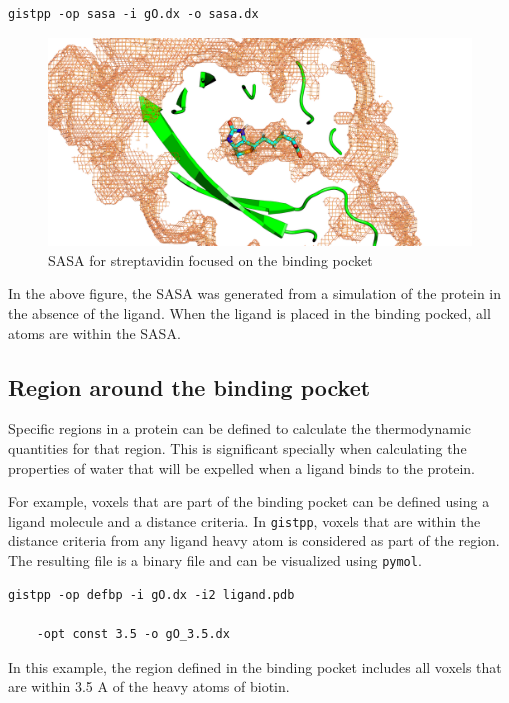 \documentclass[9pt,tutorial]{livecoms}
\newcommand{\software}{\texttt}
\begin{document}
\begin{lstlisting}[style=bash]
	gistpp -op sasa -i gO.dx -o sasa.dx
\end{lstlisting}

\begin{figure}
	\centering
	\includegraphics[width=1.0\linewidth]{streptavidin_sasa_close.png}
	\caption{SASA for streptavidin focused on the binding pocket}\label{streptavidin_sasa}
\end{figure}

In the above figure, the SASA was generated from a simulation of the protein in the absence of the ligand.
When the ligand is placed in the binding pocked, all atoms are within the SASA. 

\subsection{Region around the binding pocket}
Specific regions in a protein can be defined to calculate the thermodynamic quantities for that region.
This is significant specially when calculating the properties of water that will be expelled when a ligand binds to the protein.

For example, voxels that are part of the binding pocket can be defined using a ligand molecule and a distance criteria. In \software{gistpp}, voxels that are within the distance criteria from any ligand heavy atom is considered as part of the region. The resulting file is a binary file and can be visualized using \software{pymol}.

\begin{lstlisting}[style=bash]
	gistpp -op defbp -i gO.dx -i2 ligand.pdb 
	
	-opt const 3.5 -o gO_3.5.dx
\end{lstlisting}


In this example, the region defined in the binding pocket includes all voxels that are within 3.5 A of the heavy atoms of biotin. 
\end{document}

